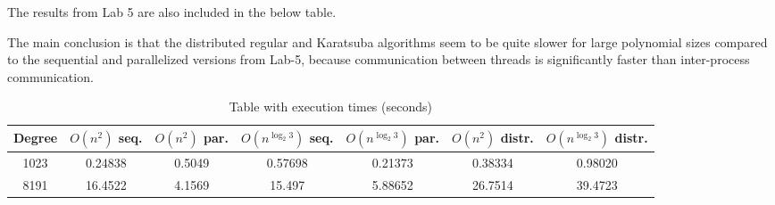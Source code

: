 \documentclass[journal, onecolumn, 12pt]{IEEEtran}
\begin{document}
The results from Lab 5 are also included in the below table.

The main conclusion is that the distributed regular and Karatsuba algorithms seem to be quite slower for large polynomial sizes compared to the sequential and parallelized versions from Lab-5, because communication between threads is significantly faster than inter-process communication.

\begin{table}[ht]
		\caption{Table with execution times (seconds)} 
\begin{tabular}{c c c c c c c} 
\hline\hline                        
		Degree & $ O(n^2) $ seq. & $ O(n^2) $ par. & $ O(n^{\log_2 3}) $ seq. & $ O(n^{\log_2 3}) $ par. & $ O(n^2) $ distr. & $ O(n^{\log_2 3}) $ distr. &\\ [2ex]
\hline\hline                        
		1023 & 0.24838 & 0.5049 & 0.57698 & 0.21373 & 0.38334 & 0.98020 \\       
		8191 & 16.4522 & 4.1569 & 15.497 & 5.88652 & 26.7514 & 39.4723 \\       
\hline\hline                        
\end{tabular}
\end{table}
	

		
\vspace{12pt}
\end{document}
